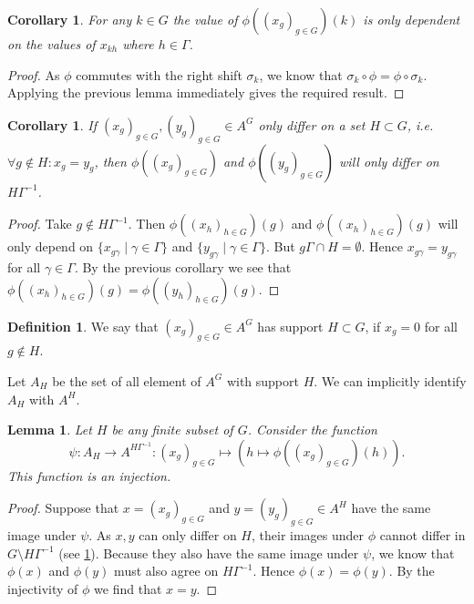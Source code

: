 \documentclass[titlepage, a4paper]{article}
\newtheorem{lemma}[theorem]{Lemma}
\newtheorem{corollary}[theorem]{Corollary}
\theoremstyle{definition}
\newtheorem{definition}[theorem]{Definition}
\theoremstyle{remark}
\begin{document}
\begin{corollary}
	For any $k \in G$ the value of $\phi((x_g)_{g \in G})(k)$ is only dependent on the values of $x_{kh}$ where $h \in \Gamma$.
\end{corollary}	
\begin{proof}
	As $\phi$ commutes with the right shift  $\sigma_k$, we know that $\sigma_k \circ \phi = \phi \circ \sigma_k$. Applying the previous lemma immediately gives the required result.
\end{proof}

\begin{corollary}\label{cor:differ_in_image}
	If $(x_g)_{g \in G}, (y_g)_{g\in G} \in A^{G}$ only differ on a set $H \subset G$, i.e. $\forall g \not\in H:x_g = y_g$,
	then  $\phi((x_g)_{g \in G})$ and $\phi((y_g)_{g \in G})$ will only differ on $H\Gamma^{-1}$.
\end{corollary}
\begin{proof}
	Take $g \not\in H\Gamma^{-1}$. Then $\phi((x_h)_{h \in G})(g)$ and $\phi((x_h)_{h\in G})(g)$ will only depend on  $\{x_{g\gamma}\mid \gamma \in \Gamma\}$ and $\{y_{g\gamma}\mid \gamma \in \Gamma\} $. But  $g\Gamma \cap H = \emptyset$. Hence $x_{g\gamma} = y_{g\gamma}$ for all $\gamma \in \Gamma$. By the previous corollary we see that $\phi((x_h)_{h \in G})(g) = \phi((y_h)_{h \in G})(g)$.
\end{proof}

\begin{definition}
	We say that $(x_g)_{g \in G} \in A^{G}$ has support $H \subset G$, if $x_g = 0$ for all $g \not\in H$.
\end{definition}
Let $A_H$ be the set of all element of  $A^{G}$ with support $H$. We can implicitly identify $A_H$ with $A^{H}$.

\begin{lemma}\label{lem:injective_restriction}
	Let $H$ be any finite subset of $G$. Consider the function  \[
		\psi:A_H \to A ^{H\Gamma^{-1}}: (x_g)_{g \in G} \mapsto \left(h \mapsto \phi((x_g)_{g \in G})(h)\right)
	.\]  
	This function is an injection. 
\end{lemma}
\begin{proof}
	Suppose that $x= (x_g)_{g \in G}$ and $ y = (y_g)_{g \in G} \in A^{H}$ have the same image under $\psi$. As $x, y$ can only differ on $ H$, their images under $\phi$ cannot differ in $G\setminus H\Gamma^{-1}$ (see \cref{cor:differ_in_image}). Because they also have the same image under $\psi$, we know that $\phi(x)$ and $\phi(y)$ must also agree on $H\Gamma^{-1}$. Hence $\phi(x) = \phi(y)$. By the injectivity of $\phi$ we find that $x = y$.
\end{proof}
\end{document}
